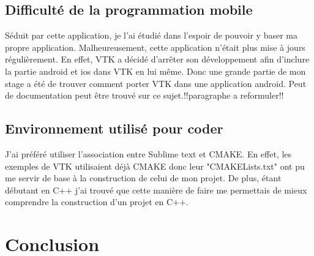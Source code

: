 \documentclass[a4paper,12pt]{article}
\begin{document}
	\subsection{Difficulté de la programmation mobile}
	 Séduit par cette application, je l'ai étudié dans l'espoir de pouvoir y baser ma propre application. Malheureusement, cette application n'était plus mise à jours régulièrement. En effet, VTK a décidé d'arrêter son développement afin d'inclure la partie android et ios dans VTK en lui même. Donc une grande partie de mon stage a été de trouver comment porter VTK dans une application android. Peut de documentation peut être trouvé sur ce sujet.!!paragraphe a reformuler!!
	 \subsection{Environnement utilisé pour coder}
J'ai préféré utiliser l'association entre Sublime text et CMAKE. En effet, les exemples de VTK utilisaient déjà CMAKE donc leur "CMAKELists.txt" ont pu me servir de base à la construction de celui de mon projet. De plus, étant débutant en C++ j'ai trouvé que cette manière de faire me permettais de mieux comprendre la construction d'un projet en C++.

\newpage
\section{Conclusion}
	
		
\end{document}
